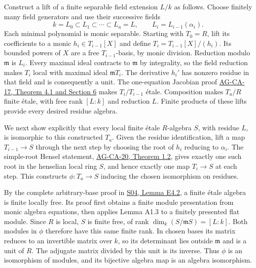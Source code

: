 \documentclass[11pt,a4paper,openany]{report}
\begin{document}
Construct a lift of a finite separable field extension \(L/k\) as follows. Choose finitely many field generators and use their successive fields \[
k=L_0\subset L_1\subset\cdots\subset L_a=L,
\qquad L_i=L_{i-1}(\alpha_i).
\] Each minimal polynomial is monic separable. Starting with \(T_0=R\), lift its coefficients to a monic \(h_i\in T_{i-1}[X]\) and define \(T_i=T_{i-1}[X]/(h_i)\). Its bounded powers of \(X\) are a free \(T_{i-1}\)-basis, by monic division. Reduction modulo \(\mathfrak m\) is \(L_i\). Every maximal ideal contracts to \(\mathfrak m\) by integrality, so the field reduction makes \(T_i\) local with maximal ideal \(\mathfrak mT_i\). The derivative \(h_i'\) has nonzero residue in that field and is consequently a unit. The one-equation Jacobian proof \href{https://github.com/KokunoYumeto/open-math-courses/blob/d02d0a3669f42579db037cd44de1d113fdd770a1/docs/courses/AG-CA/src/formally-smooth-unramified-and-etale-ring-maps.md}{AG-CA-17, Theorem 4.1 and Section 6} makes \(T_i/T_{i-1}\) étale. Composition makes \(T_a/R\) finite étale, with free rank \([L:k]\) and reduction \(L\). Finite products of these lifts provide every desired residue algebra.

We next show explicitly that every local finite étale \(R\)-algebra \(S\), with residue \(L\), is isomorphic to this constructed \(T_a\). Given the residue identification, lift a map \(T_{i-1}\to S\) through the next step by choosing the root of \(h_i\) reducing to \(\alpha_i\). The simple-root Hensel statement, \href{https://github.com/KokunoYumeto/open-math-courses/blob/main/docs/courses/AG-CA/henselian-local-rings-and-henselization.html}{AG-CA-20, Theorem 1.2}, gives exactly one such root in the henselian local ring \(S\), and hence exactly one map \(T_i\to S\) at each step. This constructs \(\phi:T_a\to S\) inducing the chosen isomorphism on residues.

By the complete arbitrary-base proof in \href{https://github.com/KokunoYumeto/open-math-courses/blob/main/docs/courses/AG-RG/AG-RG-S04.md}{S04, Lemma E4.2}, a finite étale algebra is finite locally free. Its proof first obtains a finite module presentation from monic algebra equations, then applies Lemma A1.3 to a finitely presented flat module. Since \(R\) is local, \(S\) is finite free, of rank \(\dim_k(S/\mathfrak mS)=[L:k]\). Both modules in \(\phi\) therefore have this same finite rank. In chosen bases its matrix reduces to an invertible matrix over \(k\), so its determinant lies outside \(\mathfrak m\) and is a unit of \(R\). The adjugate matrix divided by this unit is its inverse. Thus \(\phi\) is an isomorphism of modules, and its bijective algebra map is an algebra isomorphism.
\end{document}
